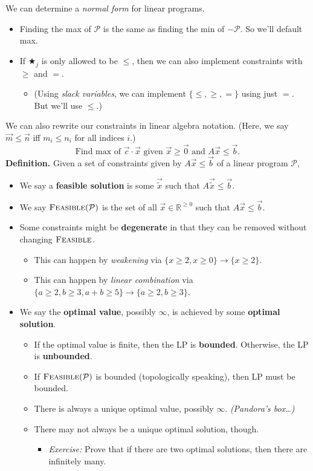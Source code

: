 We can determine a \emph{normal form} for linear programs.
\begin{itemize}
    \item Finding the max of $\mathcal{P}$ is the same as finding the min of $-\mathcal{P}$.  So we'll default max.
    \item If $\bigstar_j$ is only allowed to be $\leq$, then we can also implement constraints with $\geq$ and $=$.
    \begin{itemize}
        \item (Using \emph{slack variables}, we can implement $\{\leq, \geq, =\}$ using just $=$.  But we'll use $\leq$.)
    \end{itemize}
\end{itemize}
We can also rewrite our constraints in linear algebra notation.  (Here, we say $\vec{m} \leq \vec{n}$ iff $m_i \leq n_i$ for all indices $i$.)
\[ \text{Find max of } \vec{c} \cdot \vec{x} \text{ given } \vec{x} \geq \vec{0} \text{ and } A\vec{x} \leq \vec{b}. \]
\textbf{Definition.} Given a set of constraints given by $A \vec{x} \leq \vec{b}$ of a linear program $\mathcal{P}$,
\begin{itemize}
    \item We say a \textbf{feasible solution} is some $\vec{\tilde{x}}$ such that $A\vec{\tilde{x}} \leq \vec{b}$.
    \item We say $\textsc{Feasible}(\mathcal{P})$ is the set of all $\vec{x} \in \mathbb{R}^{\geq 0}$ such that $A\vec{x} \leq \vec{b}$.
    \item Some constraints might be \textbf{degenerate} in that they can be removed without changing $\textsc{Feasible}$.
    \begin{itemize}
        \item This can happen by \emph{weakening} via $\{x \geq 2, x \geq 0\} \to \{x \geq 2\}$.
        \item This can happen by \emph{linear combination} via $\{a \geq 2, b \geq 3, a + b \geq 5\} \to \{a \geq 2, b \geq 3\}$.
    \end{itemize}
    \item We say the \textbf{optimal value}, possibly $\infty$, is achieved by some \textbf{optimal solution}.
    \begin{itemize}
        \item If the optimal value is finite, then the LP is \textbf{bounded}.  Otherwise, the LP is \textbf{unbounded}.
        \item If $\textsc{Feasible}(\mathcal{P})$ is bounded (topologically speaking), then LP must be bounded.
        \item There is always a unique optimal value, possibly $\infty$.  \emph{(Pandora's box\dots)}
        \item There may not always be a unique optimal solution, though.
        \begin{itemize}
            \item \emph{Exercise:} Prove that if there are two optimal solutions, then there are infinitely many.
        \end{itemize}
    \end{itemize}
\end{itemize}
